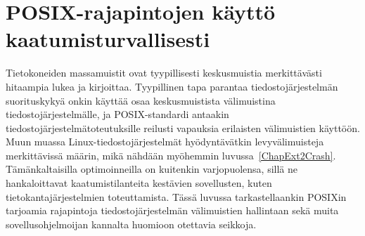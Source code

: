 \section{POSIX-rajapintojen käyttö kaatumisturvallisesti}
\label{ChapPosixDataConsistency}
Tietokoneiden massamuistit ovat tyypillisesti keskusmuistia merkittävästi hitaampia lukea ja kirjoittaa.
Tyypillinen tapa parantaa tiedostojärjestelmän suorituskykyä onkin käyttää osaa keskusmuistista välimuistina tiedostojärjestelmälle,
ja POSIX-standardi antaakin tiedostojärjestelmätoteutuksille reilusti vapauksia erilaisten välimuistien käyttöön.
Muun muassa Linux-tiedostojärjestelmät hyödyntävätkin levyvälimuisteja merkittävissä määrin,
mikä nähdään myöhemmin luvussa~\ref{ChapExt2Crash}.
Tämänkaltaisilla optimoinneilla on kuitenkin varjopuolensa,
sillä ne hankaloittavat kaatumistilanteita kestävien sovellusten, kuten tietokantajärjestelmien toteuttamista.
Tässä luvussa tarkastellaankin POSIXin tarjoamia rajapintoja tiedostojärjestelmän välimuistien hallintaan sekä muita sovellusohjelmoijan kannalta huomioon otettavia seikkoja.

